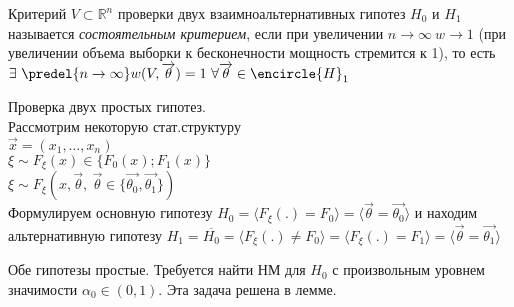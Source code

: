 \begin{defs}[Состоятельность]
    Критерий $V \subset \mathbb{R}^n$ проверки двух взаимноальтернативных гипотез $H_0$ и $H_1$
    называется \textit{состоятельным критерием}, если при увеличении $n \to \infty \ w \to 1$
    (при увеличении объема выборки к бесконечности мощность стремится к 1), то есть
    $\exists \ \predel{n \to \infty}w(V,\overrightarrow{\theta})=1 \ \forall \overrightarrow{\theta} \in \encircle{H}_1$
\end{defs}

Проверка двух простых гипотез.\\

Рассмотрим некоторую стат.структуру\\

$\overrightarrow{x}=(x_1,\ldots,x_n)$\\

$\xi \sim F_{\xi}(x) \in \{F_0(x);F_1(x)\}$\\

$\xi \sim F_{\xi}(x,\overrightarrow{\theta}, \ \overrightarrow{\theta}\in\{\overrightarrow{\theta_0}, \overrightarrow{\theta_1}\})$\\

Формулируем основную гипотезу $H_0 = \langle F_{\xi}(.)=F_0\rangle=\langle\overrightarrow{\theta}=\overrightarrow{\theta_0}\rangle$
и находим альтернативную гипотезу $H_1=\overline{H_0}=\langle F_{\xi}(.)\neq F_0\rangle=
\langle F_{\xi}(.)=F_1\rangle=\langle\overrightarrow{\theta}=\overrightarrow{\theta_1}\rangle$

Обе гипотезы простые. Требуется найти НМ для $H_0$ с произвольным уровнем значимости
$\alpha_0 \in (0,1)$. Эта задача решена в лемме.


